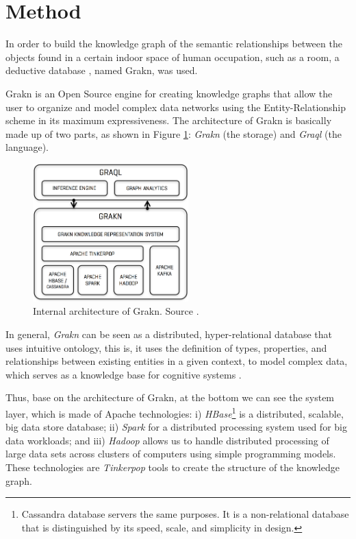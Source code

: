 \section{Method}
\label{sec:metodo}

In order to build the knowledge graph of the semantic relationships between the objects found in a certain indoor space of human occupation, such as a room, a deductive database \cite{stichbury}, named Grakn, was used.

Grakn is an Open Source engine for creating knowledge graphs that allow the user to organize and model complex data networks using the Entity-Relationship scheme in its maximum expressiveness. The architecture of Grakn is basically made up of two parts, as shown in Figure \ref{fig:arch}: \textit{Grakn} (the storage) and \textit{Graql} (the language).

\begin{figure}[H]
    \centering
    \includegraphics[width=6cm]{figures/architecture}
    \caption{Internal architecture of Grakn.
    Source \cite{stichbury}.}
    \label{fig:arch}
\end{figure}

In general, \textit{Grakn} can be seen as a distributed, hyper-relational database that uses intuitive ontology, this is, it uses the definition of types, properties, and relationships between existing entities in a given context, to model complex data, which serves as a knowledge base for cognitive systems \cite{dbengines}. 

Thus, base on the architecture of Grakn, at the bottom we can see the system layer, which is made of Apache technologies: i) \textit{HBase}\footnote{Cassandra database servers the same purposes. It is  a non-relational database that is distinguished by its speed, scale, and simplicity in design.} is a distributed, scalable, big data store database; ii) \textit{Spark} for a distributed processing system used for big data workloads; and iii) \textit{Hadoop} allows us to handle distributed processing of large data sets across clusters of computers using simple programming models. These technologies are \textit{Tinkerpop} tools to create the structure of the knowledge graph.

